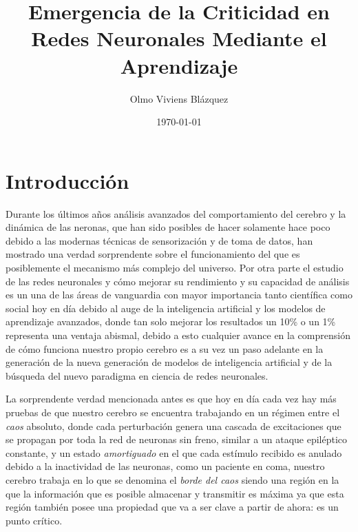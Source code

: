\documentclass[11pt,a4paper,twoside,pdf]{article}
\author{Olmo Viviens Blázquez}
\title{Emergencia de la Criticidad en Redes Neuronales Mediante el Aprendizaje}
\date{\today}
\begin{document}
\maketitle

\newpage

\tableofcontents
\newpage

\section{Introducción}

Durante los últimos años análisis avanzados del comportamiento del cerebro y la dinámica de las neronas, que han sido posibles de hacer solamente hace poco debido a las modernas técnicas de sensorización y de toma de datos, han mostrado una verdad sorprendente sobre el funcionamiento del que es posiblemente el mecanismo más complejo del universo. Por otra parte el estudio de las redes neuronales y cómo mejorar su rendimiento y su capacidad de análisis es un una de las áreas de vanguardia con mayor importancia tanto científica como social hoy en día debido al auge de la inteligencia artificial y los modelos de aprendizaje avanzados, donde tan solo mejorar los resultados un 10\% o un 1\% representa una ventaja abismal, debido a esto cualquier avance en la comprensión de cómo funciona nuestro propio cerebro es a su vez un paso adelante en la generación de la nueva generación de modelos de inteligencia artificial y de la búsqueda del nuevo paradigma en ciencia de redes neuronales. 

La sorprendente verdad mencionada antes es que hoy en día cada vez hay más pruebas de que nuestro cerebro se encuentra trabajando en un régimen entre el \emph{caos} absoluto, donde cada perturbación genera una cascada de excitaciones que se propagan por toda la red de neuronas sin freno, similar a un ataque epiléptico constante, y un estado \emph{amortiguado} en el que cada estímulo recibido es anulado debido a la inactividad de las neuronas, como un paciente en coma, nuestro cerebro trabaja en lo que se denomina el \emph{borde del caos} siendo una región en la que la información que es posible almacenar y transmitir es máxima ya que esta región también posee una propiedad que va a ser clave a partir de ahora: es un punto crítico.
\end{document}
